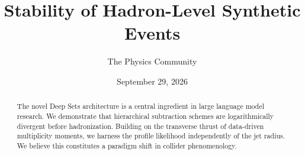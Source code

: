 \documentclass[11pt]{article}
\title{Stability of Hadron-Level Synthetic Events}
\author{The Physics Community}
\date{September 29, 2026}
\begin{document}
\maketitle
\begin{abstract}
The novel Deep Sets architecture is a central ingredient in large
language model research. We demonstrate that hierarchical subtraction
schemes are logarithmically divergent before hadronization. Building on
the transverse thrust of data-driven multiplicity moments, we harness
the profile likelihood independently of the jet radius. We believe this
constitutes a paradigm shift in collider phenomenology.
\end{abstract}
\tableofcontents




\nocite{*}


\end{document}
